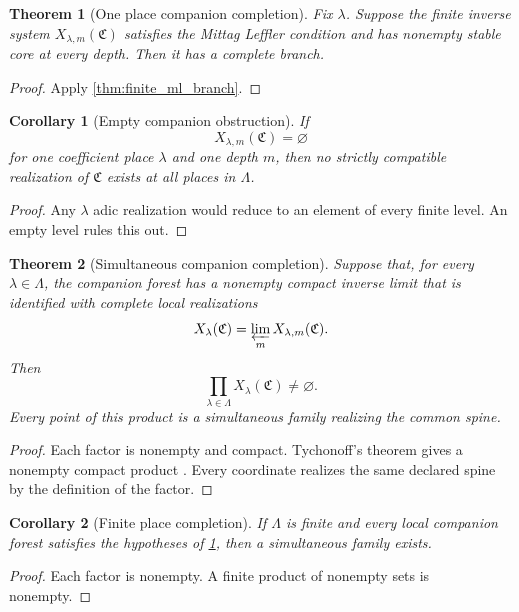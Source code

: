 \documentclass{aomart}
\newtheorem{theorem}{Theorem}[section]
\newtheorem{corollary}[corollary]{Corollary}
\theoremstyle{definition}
\theoremstyle{remark}
\newcommand{\mathfrakC}{\mathfrak C}
\begin{document}
\begin{theorem}[One place companion completion]\label{thm:one_place_completion}
Fix \(\lambda\). Suppose the finite inverse system \(X_{\lambda,m}(\mathfrakC)\) satisfies the Mittag Leffler condition and has nonempty stable core at every depth. Then it has a complete branch.
\end{theorem}

\begin{proof}
Apply \cref{thm:finite_ml_branch}.
\end{proof}

\begin{corollary}[Empty companion obstruction]\label{cor:empty_companion}
If
\[
X_{\lambda,m}(\mathfrakC)=\varnothing
\]
for one coefficient place \(\lambda\) and one depth \(m\), then no strictly compatible realization of \(\mathfrakC\) exists at all places in \(\Lambda\).
\end{corollary}

\begin{proof}
Any \(\lambda\) adic realization would reduce to an element of every finite level. An empty level rules this out.
\end{proof}

\begin{theorem}[Simultaneous companion completion]\label{thm:simultaneous_completion}
Suppose that, for every \(\lambda\in\Lambda\), the companion forest has a nonempty compact inverse limit that is identified with complete local realizations
\[
X_\lambda(\mathfrakC)
=
\varprojlim_mX_{\lambda,m}(\mathfrakC).
\]
Then
\[
\boxed{
\prod_{\lambda\in\Lambda}
X_\lambda(\mathfrakC)
\neq
\varnothing.
}
\]
Every point of this product is a simultaneous family realizing the common spine.
\end{theorem}

\begin{proof}
Each factor is nonempty and compact. Tychonoff's theorem gives a nonempty compact product \cite{Kelley1955}. Every coordinate realizes the same declared spine by the definition of the factor.
\end{proof}

\begin{corollary}[Finite place completion]\label{cor:finite_place_completion}
If \(\Lambda\) is finite and every local companion forest satisfies the hypotheses of \cref{thm:one_place_completion}, then a simultaneous family exists.
\end{corollary}

\begin{proof}
Each factor is nonempty. A finite product of nonempty sets is nonempty.
\end{proof}
\end{document}
